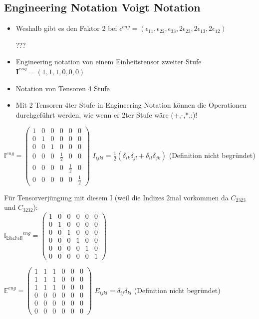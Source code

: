 \documentclass[a4paper]{scrartcl}
\begin{document}
\subsection{Engineering Notation Voigt Notation}
\begin{itemize}
\item Weshalb gibt es den Faktor 2 bei $ \epsilon^{eng}=(\epsilon_{11},\epsilon_{22},\epsilon_{33},2\epsilon_{23},2\epsilon_{13},2\epsilon_{12}) $

???


\item Engineering notation von einem Einheitstensor zweiter Stufe
$ \textbf{I}^{eng}=(1,1,1,0,0,0) $


\item Notation von Tensoren 4 Stufe
\item Mit 2 Tensoren 4ter Stufe in Engineering Notation können die Operationen
durchgeführt werden, wie wenn er 2ter Stufe wäre (+,-,*,:)!

\end{itemize}
$ \mathbb{I}^{eng}=
\begin{pmatrix}
1 & 0 & 0 & 0 & 0 & 0 \\ 
0 & 1 & 0 & 0 & 0 & 0 \\ 
0 & 0 & 1 & 0 & 0 & 0 \\ 
0 & 0 & 0 & \frac{1}{2} & 0 & 0 \\ 
0 & 0 & 0 & 0 & \frac{1}{2} & 0 \\ 
0 & 0 & 0 & 0 & 0 & \frac{1}{2}
\end{pmatrix} 
$ $I_{ijkl} = \frac{1}{2} (\delta_{ik} \delta_{jl} + \delta_{il} \delta_{jk}) $
(Definition nicht begründet)

Für Tensorverjüngung mit diesem I (weil die Indizes 2mal vorkommen da $C_{2323}$
und $C_{3232}$):\\
$ \mathbb{I_{\text{bischsil}}}^{eng}=
\begin{pmatrix}
1 & 0 & 0 & 0 & 0 & 0 \\ 
0 & 1 & 0 & 0 & 0 & 0 \\ 
0 & 0 & 1 & 0 & 0 & 0 \\ 
0 & 0 & 0 & 1 & 0 & 0 \\ 
0 & 0 & 0 & 0 & 1 & 0 \\ 
0 & 0 & 0 & 0 & 0 & 1
\end{pmatrix}$

$
\mathbb{E}^{eng}=
\begin{pmatrix}
1 & 1 & 1 & 0 & 0 & 0 \\ 
1 & 1 & 1 & 0 & 0 & 0 \\ 
1 & 1 & 1 & 0 & 0 & 0 \\ 
0 & 0 & 0 & 0 & 0 & 0 \\ 
0 & 0 & 0 & 0 & 0 & 0 \\ 
0 & 0 & 0 & 0 & 0 & 0
\end{pmatrix} 
$ $E_{ijkl} = \delta_{ij} \delta_{kl}$ (Definition nicht
begründet)
\end{document}
